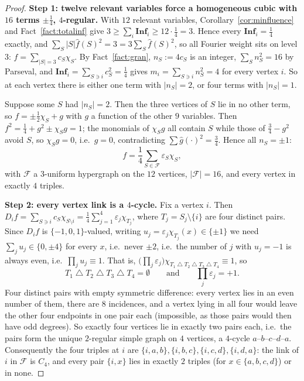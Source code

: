 \documentclass[11pt,reqno]{amsart}
\theoremstyle{plain}
\theoremstyle{definition}
\numberwithin{theorem}{section}
\newcommand{\bits}{\{-1,0,1\}}
\newcommand{\Inf}{\mathbf{Inf}}
\newcommand{\sd}{\mathbin{\triangle}}
\newcommand{\eps}{\varepsilon}
\newcommand{\Fhat}[1]{\widehat{#1}}
\begin{document}
\begin{proof}
\textbf{Step 1: twelve relevant variables force a homogeneous cubic with $16$ terms $\pm\frac14$,
$4$-regular.}
With $12$ relevant variables, Corollary~\ref{cor:minfluence} and Fact~\ref{fact:totalinf} give
$3 \ge \sum_i \Inf_i \ge 12 \cdot \frac14 = 3$. Hence every $\Inf_i = \frac14$ exactly, and
$\sum_S |S| \Fhat{f}(S)^2 = 3 = 3\sum_S \Fhat{f}(S)^2$, so all Fourier weight sits on level
$3$: $f = \sum_{|S| = 3} c_S \chi_S$. By Fact~\ref{fact:gran}, $n_S := 4 c_S$ is an integer,
$\sum_S n_S^2 = 16$ by Parseval, and $\Inf_i = \sum_{S \ni i} c_S^2 = \frac14$ gives
$m_i = \sum_{S \ni i} n_S^2 = 4$ for every vertex $i$. So at each vertex there is either one
term with $|n_S| = 2$, or four terms with $|n_S| = 1$.

Suppose some $S$ had $|n_S| = 2$. Then the three vertices of $S$ lie in no other term, so
$f = \pm\frac12 \chi_S + g$ with $g$ a function of the other $9$ variables. Then
$f^2 = \frac14 + g^2 \pm \chi_S g = 1$; the monomials of $\chi_S g$ all contain $S$ while those
of $\frac34 - g^2$ avoid $S$, so $\chi_S g = 0$, i.e.\ $g = 0$, contradicting
$\sum \Fhat{g}(\cdot)^2 = \frac34$. Hence all $n_S = \pm 1$:
\[
  f = \frac14 \sum_{S \in \mathcal{F}} \eps_S \chi_S,
\]
with $\mathcal{F}$ a $3$-uniform hypergraph on the $12$ vertices, $|\mathcal{F}| = 16$, and
every vertex in exactly $4$ triples.

\smallskip\noindent\textbf{Step 2: every vertex link is a $4$-cycle.}
Fix a vertex $i$. Then
$D_i f = \sum_{S \ni i} c_S \chi_{S \setminus i} = \frac14\sum_{j=1}^4 \eps_j \chi_{T_j}$, where
$T_j = S_j \setminus \{i\}$ are four distinct pairs. Since $D_i f$ is $\bits$-valued, writing
$u_j = \eps_j \chi_{T_j}(x) \in \{\pm1\}$ we need $\sum_j u_j \in \{0, \pm 4\}$ for every $x$,
i.e.\ never $\pm 2$, i.e.\ the number of $j$ with $u_j = -1$ is always even, i.e.\
$\prod_j u_j \equiv 1$. That is,
$\big(\prod_j \eps_j\big)\chi_{T_1 \sd T_2 \sd T_3 \sd T_4} \equiv 1$, so
\[
  T_1 \sd T_2 \sd T_3 \sd T_4 = \emptyset \qquad \text{and} \qquad \prod_j \eps_j = +1 .
\]
Four distinct pairs with empty symmetric difference: every vertex lies in an even number of
them, there are $8$ incidences, and a vertex lying in all four would leave the other four
endpoints in one pair each (impossible, as those pairs would then have odd degrees). So exactly
four vertices lie in exactly two pairs each, i.e.\ the pairs form the unique $2$-regular simple
graph on $4$ vertices, a $4$-cycle $a$--$b$--$c$--$d$--$a$. Consequently the four triples at $i$
are $\{i,a,b\}, \{i,b,c\}, \{i,c,d\}, \{i,d,a\}$: the link of $i$ in $\mathcal{F}$ is $C_4$, and
every pair $\{i,x\}$ lies in exactly $2$ triples (for $x \in \{a,b,c,d\}$) or in none.


\end{proof}
\end{document}
